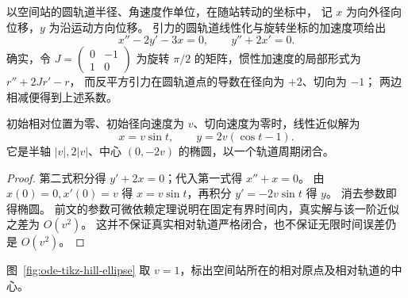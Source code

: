 \begin{example}[空间站抛出物体]
以空间站的圆轨道半径、角速度作单位，在随站转动的坐标中，
记 $x$ 为向外径向位移，$y$ 为沿运动方向位移。
引力的圆轨道线性化与旋转坐标的加速度项给出
\[
 x''-2y'-3x=0,\qquad y''+2x'=0.
\]
确实，令 $J=\left(\begin{smallmatrix}0&-1\\1&0\end{smallmatrix}\right)$ 为旋转 $\pi/2$ 的矩阵，惯性加速度的局部形式为 $r''+2Jr'-r$，
而反平方引力在圆轨道点的导数在径向为 $+2$、切向为 $-1$；
两边相减便得到上述系数。
\end{example}
\begin{proposition}
初始相对位置为零、初始径向速度为 $v$、切向速度为零时，线性近似解为
\[
 x=v\sin t,\qquad y=2v(\cos t-1).
\]
它是半轴 $|v|,2|v|$、中心 $(0,-2v)$ 的椭圆，以一个轨道周期闭合。
\end{proposition}
\begin{proof}
第二式积分得 $y'+2x=0$；代入第一式得 $x''+x=0$。
由 $x(0)=0,x'(0)=v$ 得 $x=v\sin t$，再积分 $y'=-2v\sin t$ 得 $y$。
消去参数即得椭圆。
前文的参数可微依赖定理说明在固定有界时间内，真实解与该一阶近似之差为 $O(v^2)$。
这并不保证真实相对轨道严格闭合，也不保证无限时间误差仍是 $O(v^2)$。
\end{proof}


图~\ref{fig:ode-tikz-hill-ellipse} 取 $v=1$，标出空间站所在的相对原点及相对轨道的中心。
\begin{center}
\begin{minipage}{0.96\linewidth}
\centering
\label{fig:ode-tikz-hill-ellipse}
\end{minipage}
\end{center}

